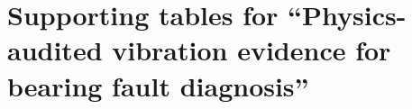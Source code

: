 \documentclass[10pt,letterpaper]{article}
\begin{document}
\section*{Supporting tables for ``Physics-audited vibration evidence for bearing fault diagnosis''}






\end{document}
